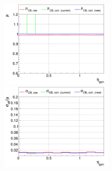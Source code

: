 \begin{figure}
\includegraphics[width=0.495\textwidth]{./plots_pdf/ECAL_plots/plotsNOPU/EB/FULL/pdf/GENETA/EBFULL_GENETA_0100_0300_MuOverBins.pdf}
\includegraphics[width=0.495\textwidth]{./plots_pdf/ECAL_plots/plotsNOPU/EB/FULL/pdf/GENETA/EBFULL_GENETA_0100_0300_EffSigmaOverBins.pdf}

\caption [NoPU EB Full Readout (top) low $\eta$, (middle) mid $\eta$, (bottom) high $\eta$ ]{}
\label{fig:NOPU_EBFULL_eta}
\end{figure}









